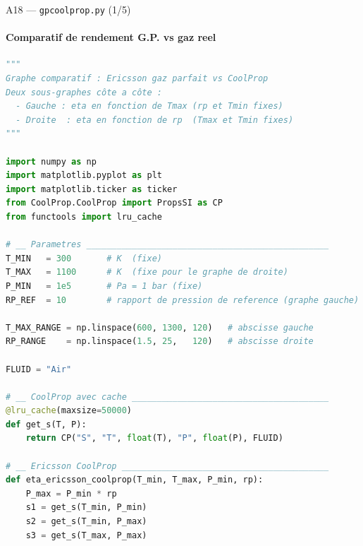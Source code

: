 \documentclass[aspectratio=43, 10pt]{beamer}
\begin{document}
\begin{frame}[fragile]{A18 --- \texttt{gpcoolprop.py} (1/5)}
  \framesubtitle{Comparatif de rendement G.P. vs gaz reel}
  \begin{exampleblock}{}
  \begin{lstlisting}[language=Python, basicstyle=\tiny\ttfamily]
"""
Graphe comparatif : Ericsson gaz parfait vs CoolProp
Deux sous-graphes côte a côte :
  - Gauche : eta en fonction de Tmax (rp et Tmin fixes)
  - Droite  : eta en fonction de rp  (Tmax et Tmin fixes)
"""

import numpy as np
import matplotlib.pyplot as plt
import matplotlib.ticker as ticker
from CoolProp.CoolProp import PropsSI as CP
from functools import lru_cache

# __ Parametres ________________________________________________
T_MIN   = 300       # K  (fixe)
T_MAX   = 1100      # K  (fixe pour le graphe de droite)
P_MIN   = 1e5       # Pa = 1 bar (fixe)
RP_REF  = 10        # rapport de pression de reference (graphe gauche)

T_MAX_RANGE = np.linspace(600, 1300, 120)   # abscisse gauche
RP_RANGE    = np.linspace(1.5, 25,   120)   # abscisse droite

FLUID = "Air"

# __ CoolProp avec cache _______________________________________
@lru_cache(maxsize=50000)
def get_s(T, P):
    return CP("S", "T", float(T), "P", float(P), FLUID)

# __ Ericsson CoolProp _________________________________________
def eta_ericsson_coolprop(T_min, T_max, P_min, rp):
    P_max = P_min * rp
    s1 = get_s(T_min, P_min)
    s2 = get_s(T_min, P_max)
    s3 = get_s(T_max, P_max)
  \end{lstlisting}
  \end{exampleblock}
\end{frame}
\end{document}
